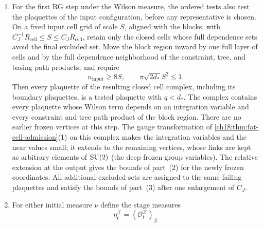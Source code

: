 \begin{theorem}
\begin{enumerate}
\[ R_{\mathrm{first}}(f)\le C_J(W+R_{\mathrm{cell}}+1),
\]
where $R_{\mathrm{first}}(f)$ refers to the RG step in which $f$ fails. The number of scalar labels assigned to $f$ is at most $C_J(BW+R_{\mathrm{cell}}+1)^3$ in that RG step and at most $C_J(W+R_{\mathrm{cell}}+1)^3$ in each later RG step. The final plaquettes whose full dependence sets meet a neighborhood assigned to $f$ are at most
\[
 F_J=C_J(W+R_{\mathrm{cell}}+1)^3
\]
in number, with a fixed enlargement for each of the finitely many remaining numbers of averaging steps after the last RG step (\cref{ch18:thm:slice-induction}). These estimates are subadditive under unions. A set of failing plaquettes that can be produced by the ordered tests determines at most one large-field decomposition. The constants $C_J$ have the dependence stated at the beginning of this section and are independent of the later widths; the displayed polynomials exhibit the dependence of the counts on the widths.
\item For the first RG step under the Wilson measure, the ordered tests also test the plaquettes of the input configuration, before any representative is chosen. On a fixed input cell grid of scale $S$, aligned with the blocks, with $C_J^{-1}R_{\mathrm{cell}}\le S\le C_JR_{\mathrm{cell}}$, retain only the closed cells whose full dependence sets avoid the final excluded set. Move the block region inward by one full layer of cells and by the full dependence neighborhood of the constraint, tree, and basing path products, and require
\[
 n_{\mathrm{input}}\ge8S,\qquad
 \pi\sqrt{2d_*}S^2\le1.
\]
Then every plaquette of the resulting closed cell complex, including its boundary plaquettes, is a tested plaquette with $q<d_*$. The complex contains every plaquette whose Wilson term depends on an integration variable and every constraint and tree path product of the block region. There are no earlier frozen vertices at this step. The gauge transformation of \cref{ch18:thm:fat-cell-admission}(1) on this complex makes the integration variables and the near values small; it extends to the remaining vertices, whose links are kept as arbitrary elements of $\mathrm{SU}(2)$ (the deep frozen group variables). The relative extension at the output gives the bounds of part~(2) for the newly frozen coordinates. All additional excluded sets are assigned to the same failing plaquettes and satisfy the bounds of part~(3) after one enlargement of $C_J$.
\item For either initial measure $\nu$ define the stage measures
\[
 \eta_t^{\mathcal X}
   =(\mathscr O_t^{\mathcal X})_\#
\]
\end{enumerate}
\end{theorem}
